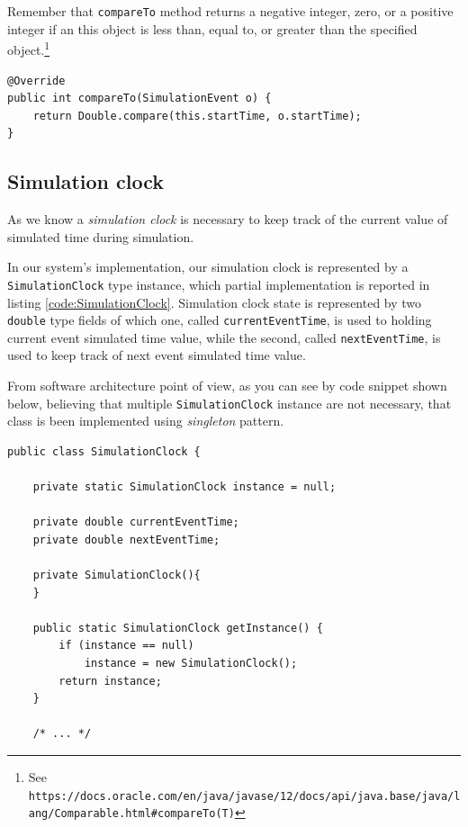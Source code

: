 \documentclass[10pt,a4paper]{article}
\begin{document}
Remember that \texttt{compareTo} method returns a negative integer, zero, or a positive integer if an  this object is less than, equal to, or greater than the specified object.\footnote{See \texttt{https://docs.oracle.com/en/java/javase/12/docs/api/java.base/java/lang/Comparable.html\#compareTo(T)}}


\begin{lstlisting}[frame=lines, caption={Snippet of \texttt{SimulationEvent} class implementation}, label={code:compareTo}]
@Override
public int compareTo(SimulationEvent o) {
	return Double.compare(this.startTime, o.startTime);
}
\end{lstlisting}

\subsection{Simulation clock}

As we know a \textit{simulation clock} is necessary to keep track of the current value of simulated time during simulation. 

In our system's implementation, our simulation clock is represented by a \texttt{SimulationClock} type instance, which partial implementation is reported in listing \ref{code:SimulationClock}. Simulation clock state is represented by two \texttt{double} type fields of which one, called \texttt{currentEventTime}, is used to holding current event simulated time value, while the second, called \texttt{nextEventTime}, is used to keep track of next event simulated time value.

From software architecture point of view, as you can see by code snippet shown below, believing that multiple \texttt{SimulationClock} instance are not necessary, that class is been implemented using \textit{singleton} pattern. 

\begin{lstlisting}[frame=lines, caption={\texttt{SimulationClock} class implementation.}, label={code:SimulationClock}]
public class SimulationClock {

    private static SimulationClock instance = null;

    private double currentEventTime;
    private double nextEventTime;

    private SimulationClock(){
    }

    public static SimulationClock getInstance() {
        if (instance == null)
            instance = new SimulationClock();
        return instance;
    }
    
    /* ... */
\end{lstlisting}
\end{document}
